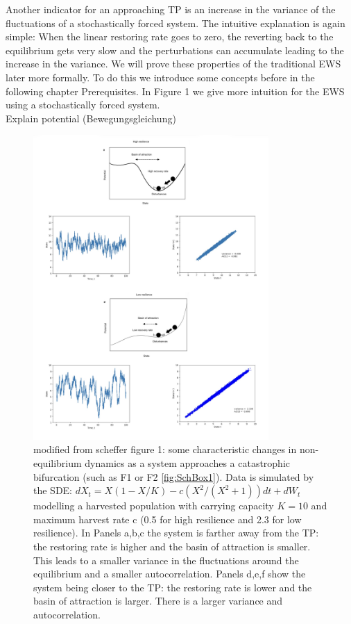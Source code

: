 \documentclass[%
thesis=student,%
coverpage=false,%
titlepage=false,%
headmarks=true, %
german,%
font=libertine, %
math=newpxtx, %
BCOR=5mm,%
coverBCOR=11mm%
]{tumbook}
\begin{document}
Another indicator for an approaching TP is an increase in the variance of the fluctuations of a stochastically forced system. The intuitive explanation is again simple: When the linear restoring rate goes to zero, the reverting back to the equilibrium gets very slow and the perturbations can accumulate leading to the increase in the variance. 
We will prove these properties of the traditional EWS later more formally. To do this we introduce some concepts before in the following chapter Prerequisites. In Figure 1 we give more intuition for the EWS using a stochastically forced system. \\

Explain potential (Bewegungsgleichung)



\begin{figure}[h]
    \centering
    \includegraphics[width=0.8\textwidth]{bachelor-thesis/figures/scheffer_fig1_reimp_v1.jpg}
    \caption{modified from scheffer figure 1: some characteristic changes in non-equilibrium dynamics as a system approaches a catastrophic bifurcation (such as F1 or F2 \ref{fig:SchBox1}). Data is simulated by the SDE: $dX_{t}=X(1-X/K)-c(X^2/(X^2+1))dt + dW_{t}$ modelling a harvested population with carrying capacity $K = 10$ and maximum harvest rate c (0.5 for high resilience and 2.3 for low resilience). In Panels a,b,c the system is farther away from the TP: the restoring rate is higher and the basin of attraction is smaller. This leads to a smaller variance in the fluctuations around the equilibrium and a smaller autocorrelation. Panels d,e,f show the system being closer to the TP: the restoring rate is lower and the basin of attraction is larger. There is a larger variance and autocorrelation.}
    \label{fig:enter-label}
\end{figure}
\end{document}
